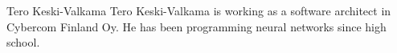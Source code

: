 \documentclass[journal]{IEEEtran}
\begin{document}
\appendices




\begin{IEEEbiography}{Tero Keski-Valkama}
Tero Keski-Valkama is working as a software architect in Cybercom Finland Oy. He has been programming neural networks since high school.
\end{IEEEbiography}
\end{document}
